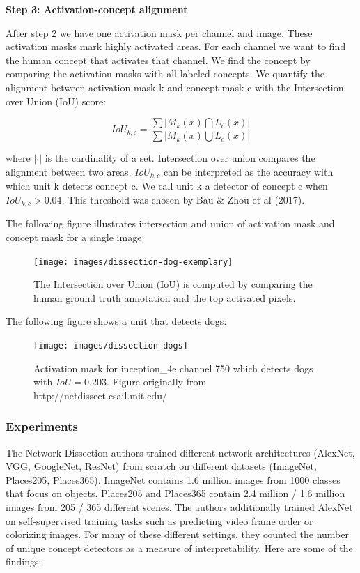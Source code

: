 \documentclass[
  11pt,
]{scrbook}
\begin{document}
\textbf{Step 3: Activation-concept alignment}

After step 2 we have one activation mask per channel and image.
These activation masks mark highly activated areas.
For each channel we want to find the human concept that activates that channel.
We find the concept by comparing the activation masks with all labeled concepts.
We quantify the alignment between activation mask k and concept mask c with the Intersection over Union (IoU) score:

\[IoU_{k,c}=\frac{\sum|M_k(x)\bigcap{}L_c(x)|}{\sum|M_k(x)\bigcup{}L_c(x)|}\]

where \(|\cdot|\) is the cardinality of a set.
Intersection over union compares the alignment between two areas.
\(IoU_{k,c}\) can be interpreted as the accuracy with which unit k detects concept c.
We call unit k a detector of concept c when \(IoU_{k,c}>0.04\).
This threshold was chosen by Bau \& Zhou et al (2017).

The following figure illustrates intersection and union of activation mask and concept mask for a single image:

\begin{figure}

{\centering \texttt{[image: images/dissection-dog-exemplary]} 

}

\caption{The Intersection over Union (IoU) is computed by comparing the human ground truth annotation and the top activated pixels.}\label{fig:unnamed-chunk-55}
\end{figure}

The following figure shows a unit that detects dogs:

\begin{figure}

{\centering \texttt{[image: images/dissection-dogs]} 

}

\caption{Activation mask for inception\_4e channel 750 which detects dogs with $IoU=0.203$. Figure originally from http://netdissect.csail.mit.edu/}\label{fig:unnamed-chunk-56}
\end{figure}

\hypertarget{experiments}{%
\subsubsection{Experiments}\label{experiments}}

The Network Dissection authors trained different network architectures (AlexNet, VGG, GoogleNet, ResNet) from scratch on different datasets (ImageNet, Places205, Places365).
ImageNet contains 1.6 million images from 1000 classes that focus on objects.
Places205 and Places365 contain 2.4 million / 1.6 million images from 205 / 365 different scenes.
The authors additionally trained AlexNet on self-supervised training tasks such as predicting video frame order or colorizing images.
For many of these different settings, they counted the number of unique concept detectors as a measure of interpretability.
Here are some of the findings:
\end{document}
